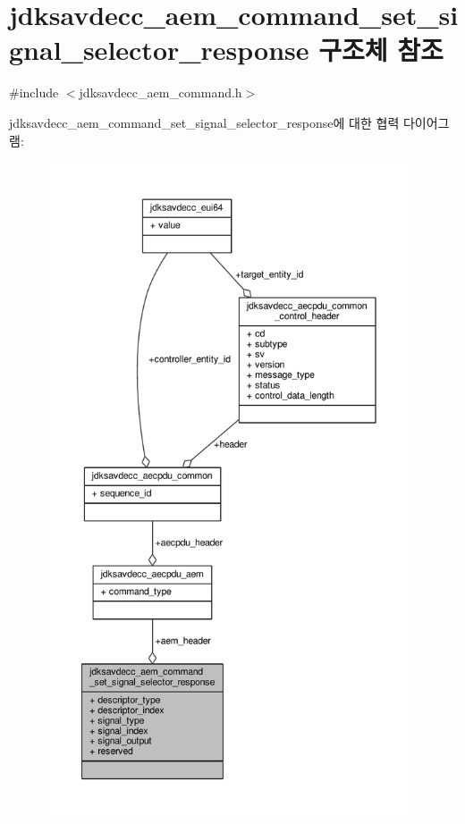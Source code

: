 \hypertarget{structjdksavdecc__aem__command__set__signal__selector__response}{}\section{jdksavdecc\+\_\+aem\+\_\+command\+\_\+set\+\_\+signal\+\_\+selector\+\_\+response 구조체 참조}
\label{structjdksavdecc__aem__command__set__signal__selector__response}


{\ttfamily \#include $<$jdksavdecc\+\_\+aem\+\_\+command.\+h$>$}



jdksavdecc\+\_\+aem\+\_\+command\+\_\+set\+\_\+signal\+\_\+selector\+\_\+response에 대한 협력 다이어그램\+:
\nopagebreak
\begin{figure}[H]
\begin{center}
\leavevmode
\includegraphics[height=550pt]{structjdksavdecc__aem__command__set__signal__selector__response__coll__graph}
\end{center}
\end{figure}
